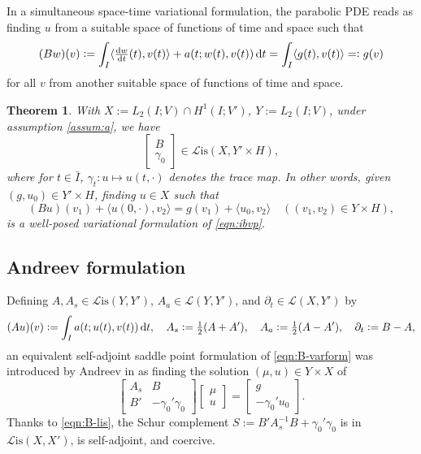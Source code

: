 \documentclass[11pt,a4paper,oneside,english]{amsart}
\numberwithin{equation}{section}
\newtheorem{theorem}{Theorem}
\numberwithin{theorem}{section}
\theoremstyle{definition}
\newcommand{\la}{\langle}
\newcommand{\ra}{\rangle}
\newcommand{\cL}{\mathcal L}
\newcommand{\Lis}{\cL\mathrm{is}}
\begin{document}
In a simultaneous space-time variational formulation, the parabolic PDE reads as
finding $u$ from a suitable space of functions of time and space such that
\begin{equation}
  \label{eqn:B-var-form}
  (Bw)(v):=\int_I \la \tfrac{\dif w}{\dif t}(t), v(t) \ra + a(t;w(t),v(t)) \dif t = \int_I \la g(t), v(t) \ra =:g(v)
\end{equation}
for all $v$ from another suitable space of functions of time and space.

\begin{theorem}
  \label{thm:varform}
  With $X:=L_2(I;{V}) \cap H^1(I;V')$, $Y:=L_2(I;{V})$, under assumption \ref{assum:a}, we have
  \begin{equation}
    \label{eqn:B-lis}
    \begin{bmatrix} B \\ \gamma_0\end{bmatrix}\in \Lis(X,Y' \times H),
  \end{equation}
  where for $t \in \bar I$, $\gamma_t\colon u \mapsto u(t,\cdot)$ denotes the trace map.
  In other words, given $(g, u_0) \in Y' \times H$, finding $u \in X$ such that 
  \begin{equation}
    \label{eqn:B-varform}
    (Bu)(v_1)+\la u(0,\cdot),v_2\ra=g(v_1)+\la u_0,v_2\ra\quad ((v_1,v_2) \in Y \times H),
  \end{equation}
  is a well-posed variational formulation of \eqref{eqn:ibvp}.
\end{theorem}

\subsection{Andreev formulation}
Defining $A, A_s \in \Lis(Y,Y')$, $A_a \in \cL(Y,Y')$, and $\partial_t \in \cL(X,Y')$ by 
\[
(Au)(v):=\int_I a(t;u(t),v(t)) \dif t, \quad A_s:=\tfrac12(A+A'), \quad A_a:=\tfrac12(A-A'), \quad \partial_t:=B-A,
\]
an equivalent self-adjoint saddle point formulation of \eqref{eqn:B-varform} was
introduced by Andreev in \cite{Andreev2013} as finding the solution $(\mu,u) \in Y\times X$ of
\[
  \begin{bmatrix} A_s & B\\ B' & -\gamma_0' \gamma_0 \end{bmatrix}
  \begin{bmatrix} \mu \\ u \end{bmatrix}=
  \begin{bmatrix} g \\ -\gamma_0' u_0 \end{bmatrix}.
\]
Thanks to \eqref{eqn:B-lis}, the Schur complement $S := B' A_s^{-1} B+\gamma_0'\gamma_0$ is in $\Lis(X, X')$, is self-adjoint, and coercive.
\end{document}
